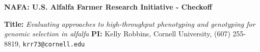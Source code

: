 \documentclass[10pt, letterpaper]{article}
\author{Nicholas Santantonio}
\date{\today}
\begin{document}
\noindent  \LARGE{\textbf{NAFA: U.S. Alfalfa Farmer Research Initiative - Checkoff}}

\noindent \Large{\textbf{Title:} \textit{Evaluating approaches to high-throughput phenotyping and genotyping for genomic selection in alfalfa}} \hfill \normalsize{\textbf{PI:} Kelly Robbins, Cornell University, (607) 255-8819, \texttt{krr73@cornell.edu}} \\




\end{document}
